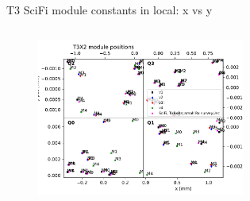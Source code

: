 \documentclass[aspectratio=1610, 12pt]{beamer}
\begin{document}
\begin{frame}{T3 SciFi module constants in local: x vs y}
\begin{columns}
\begin{column}[c]{0.5\textwidth}
\begin{figure}
        \includegraphics[width=0.61\textwidth]{plots/out_x_y_pos/retest_x_vs_y_local_T3X2.pdf}
      \end{figure}
    \end{column}
  \end{columns}
\end{frame}
\end{document}
